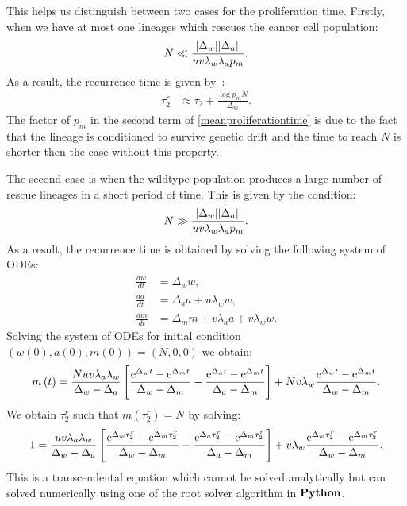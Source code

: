 \documentclass[12pt]{extarticle}
\newcommand{\e}{{\rm e}}
\begin{document}
\begin{appendices}
This helps us distinguish between two cases for the proliferation time. Firstly, when we have at most one lineages which rescues the cancer cell population:
\begin{equation*}
N\ll\frac{\abs{\Delta_w}\abs{\Delta_a}}{uv\lambda_w\lambda_ap_m}.
\end{equation*}
As a result, the recurrence time is given by~\citep{avanzini2019cancer}:
\begin{align}\label{meanproliferationtime}
\tau_2^r&\approx\tau_2+\frac{\log p_mN}{\Delta_m}.
\end{align}
The factor of $p_m$ in the second term of \cref{meanproliferationtime} is due to the fact that the lineage is conditioned to survive genetic drift and the time to reach $N$ is shorter then the case without this property. 

The second case is when the wildtype population produces a large number of rescue lineages in a short period of time. This is given by the condition:
\begin{align*}
N\gg\frac{\abs{\Delta_w}\abs{\Delta_a}}{uv\lambda_w\lambda_ap_m}.
\end{align*}
As a result, the recurrence time is obtained by solving the following system of ODEs:
\begin{equation}\label{detODE}
\begin{aligned}
\frac{dw}{dt}&=\Delta_ww,\\
\frac{da}{dt}&=\Delta_aa+u\lambda_ww,\\
\frac{dm}{dt}&=\Delta_mm+v\lambda_aa+v\lambda_ww.
\end{aligned}
\end{equation}
Solving the system of ODEs for initial condition $\left(w(0), a(0), m(0)\right)=\left(N,0,0\right)$ we obtain:
\begin{align*}
m\left(t\right)=\frac{Nuv\lambda_a\lambda_w}{\Delta_w-\Delta_a}\left[\frac{\e^{\Delta_wt}-\e^{\Delta_mt}}{\Delta_w-\Delta_m}-\frac{\e^{\Delta_at}-\e^{\Delta_mt}}{\Delta_a-\Delta_m}\right]+Nv\lambda_w\frac{\e^{\Delta_wt}-\e^{\Delta_mt}}{\Delta_w-\Delta_m}.
\end{align*}
We obtain $\tau_2^r$ such that $m\left(\tau_2^r\right)=N$ by solving:
\begin{equation}\label{eq:t2det}
1=\frac{uv\lambda_a\lambda_w}{\Delta_w-\Delta_a}\left[\frac{\e^{\Delta_w\tau_2^r}-\e^{\Delta_m\tau_2^r}}{\Delta_w-\Delta_m}-\frac{\e^{\Delta_a\tau_2^r}-\e^{\Delta_m\tau_2^r}}{\Delta_a-\Delta_m}\right]+v\lambda_w\frac{\e^{\Delta_w\tau_2^r}-\e^{\Delta_m\tau_2^r}}{\Delta_w-\Delta_m}.
\end{equation}
This is a transcendental equation which cannot be solved analytically but can solved numerically using one of the root solver algorithm in $\bold{Python}$. 


\end{appendices}
\end{document}
